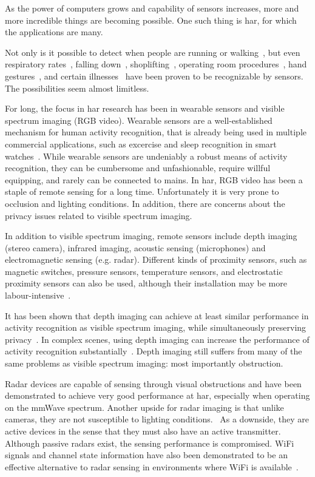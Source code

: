 As the power of computers grows and capability of sensors increases,
more and more incredible things are becoming possible.
One such thing is \gls{har},
for which the applications are many.

Not only is it possible to detect when people are running or walking~\cite{running-walking},
but even respiratory rates~\cite{breathing}, falling down~\cite{falling}, shoplifting~\cite{shoplifting},
operating room procedures~\cite{operatingroom}, hand gestures~\cite{handgestures},
and certain illnesses~\cite{parkinsson} have been proven to be recognizable by sensors.
The possibilities seem almost limitless.

For long, the focus in \gls{har} research has been in wearable sensors and visible spectrum imaging (RGB video).
Wearable sensors are a well-established mechanism for human activity recognition, that is already being used in multiple commercial applications,
such as excercise and sleep recognition in smart watches~\cite{wearables}.
While wearable sensors are undeniably a robust means of activity recognition,
they can be cumbersome and unfashionable, require willful equipping, and rarely can be connected to mains.
In \gls{har}, RGB video has been a staple of remote sensing for a long time.
Unfortunately it is very prone to occlusion and lighting conditions.
In addition, there are concerns about the privacy issues related to visible spectrum imaging.~\cite{sensing-survey}

In addition to visible spectrum imaging,
remote sensors include depth imaging (stereo camera),
infrared imaging, acoustic sensing (microphones) and electromagnetic sensing (e.g. radar).
Different kinds of proximity sensors, such as magnetic switches, pressure sensors, temperature sensors,
and electrostatic proximity sensors can also be used,
although their installation may be more labour-intensive~\cite{sensing-survey}.

It has been shown that depth imaging can achieve at least similar performance in activity recognition as visible spectrum imaging,
while simultaneously preserving privacy~\cite{depth}.
In complex scenes, using depth imaging can increase the performance of activity recognition substantially~\cite{depth-2}.
Depth imaging still suffers from many of the same problems as visible spectrum imaging:
most importantly obstruction.

Radar devices are capable of sensing through visual obstructions
and have been demonstrated to achieve very good performance at \gls{har},
especially when operating on the \gls{mmWave} spectrum.
Another upside for radar imaging is that unlike cameras, 
they are not susceptible to lighting conditions.~\cite{radar-survey}
As a downside, they are active devices in the sense that they must also have an active transmitter.
Although passive radars exist, the sensing performance is compromised.
WiFi signals and channel state information have also been demonstrated to be an effective alternative to radar sensing
in environments where WiFi is available~\cite{sensing-survey}.

